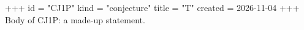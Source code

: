 +++
id = "CJ1P"
kind = "conjecture"
title = "T"
created = 2026-11-04
+++
Body of CJ1P: a made-up statement.
